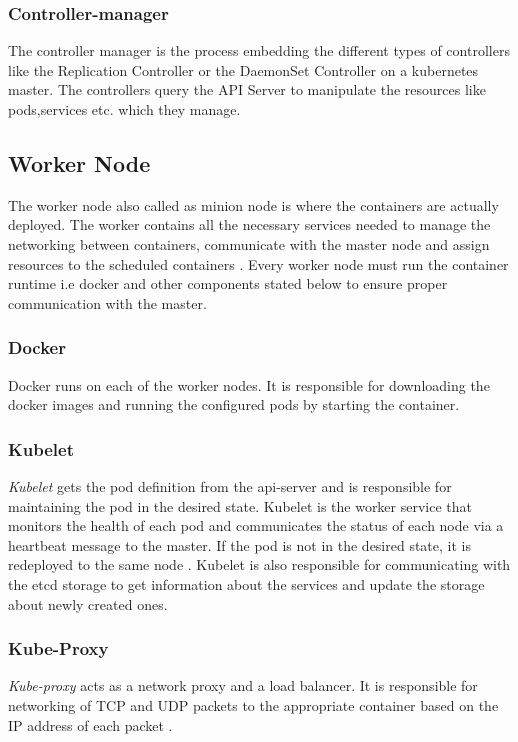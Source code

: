 \documentclass[9pt,twocolumn,twoside]{../../styles/osajnl}
\begin{document}
\subsubsection{Controller-manager}
The controller manager is the process embedding the different types of
controllers like the Replication Controller or the DaemonSet
Controller on a kubernetes master. The controllers query the API
Server to manipulate the resources like pods,services etc. which they
manage.

\subsection{Worker Node}
The worker node also called as minion node is where the containers are
actually deployed. The worker contains all the necessary services
needed to manage the networking between containers, communicate with
the master node and assign resources to the scheduled containers
\cite{www-kubernetes-architecture}.  Every worker node must run the
container runtime i.e docker and other components stated below to
ensure proper communication with the master.

\subsubsection{Docker}
Docker runs on each of the worker nodes. It is responsible for
downloading the docker images and running the configured pods by
starting the container.

\subsubsection{Kubelet}
\emph{Kubelet} gets the pod definition from the api-server and is
responsible for maintaining the pod in the desired state. Kubelet is
the worker service that monitors the health of each pod and
communicates the status of each node via a heartbeat message to the
master.  If the pod is not in the desired state, it is redeployed to
the same node \cite{www-wiki-kubernetes}. Kubelet is also responsible
for communicating with the etcd storage to get information about the
services and update the storage about newly created ones.

\subsubsection{Kube-Proxy}
\emph{Kube-proxy} acts as a network proxy and a load balancer. It is
responsible for networking of TCP and UDP packets to the appropriate
container based on the IP address of each packet
\cite{www-wiki-kubernetes} \cite{www-kubernetes-architecture}.
\end{document}
